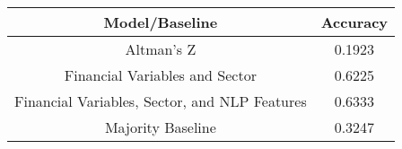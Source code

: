 \footnotesize
\begin{tabular}{cc}
\toprule
Model/Baseline & Accuracy \\
\midrule
Altman's Z & 0.1923 \\
Financial Variables and Sector & 0.6225 \\
Financial Variables, Sector, and NLP Features & 0.6333 \\
Majority Baseline & 0.3247 \\
\bottomrule
\end{tabular}

\normalsize